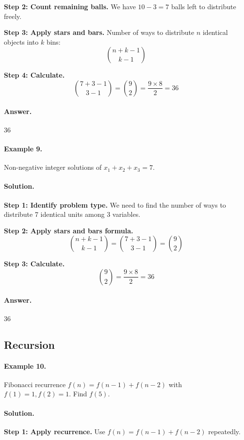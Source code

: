 \documentclass[12pt]{extarticle}
\begin{document}
\textbf{Step 2: Count remaining balls.} We have $10 - 3 = 7$ balls left to distribute freely.

\textbf{Step 3: Apply stars and bars.} Number of ways to distribute $n$ identical objects into $k$ bins:
\[
\binom{n+k-1}{k-1}
\]

\textbf{Step 4: Calculate.}
\[
\binom{7+3-1}{3-1} = \binom{9}{2} = \frac{9 \times 8}{2} = 36
\]

\paragraph{Answer.} $\boxed{36}$

\paragraph{Example 9.} Non-negative integer solutions of $x_1+x_2+x_3=7$.

\paragraph{Solution.}
\textbf{Step 1: Identify problem type.} We need to find the number of ways to distribute 7 identical units among 3 variables.

\textbf{Step 2: Apply stars and bars formula.}
\[
\binom{n+k-1}{k-1} = \binom{7+3-1}{3-1} = \binom{9}{2}
\]

\textbf{Step 3: Calculate.}
\[
\binom{9}{2} = \frac{9 \times 8}{2} = 36
\]

\paragraph{Answer.} $\boxed{36}$

\subsection{Recursion}

\paragraph{Example 10.} Fibonacci recurrence $f(n)=f(n-1)+f(n-2)$ with $f(1)=1,f(2)=1$. Find $f(5)$.

\paragraph{Solution.}
\textbf{Step 1: Apply recurrence.} Use $f(n)=f(n-1)+f(n-2)$ repeatedly.
\end{document}
